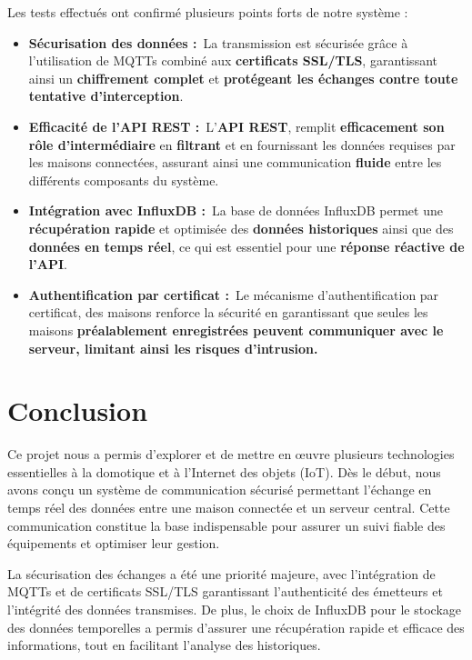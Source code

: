 \documentclass[10pt, a4paper]{report}
\begin{document}
	Les tests effectués ont confirmé plusieurs points forts de notre système : 
	\begin{itemize}
		\item  \textbf{Sécurisation des données :} La transmission est sécurisée grâce à l'utilisation de MQTTs combiné aux \textbf{certificats SSL/TLS}, garantissant ainsi un \textbf{chiffrement complet} et \textbf{protégeant les échanges contre toute tentative d'interception}.  
		\item  \textbf{Efficacité de l’API REST :} L’\textbf{API REST}, remplit \textbf{efficacement son rôle d'intermédiaire} en \textbf{filtrant} et en fournissant les données requises par les maisons connectées, assurant ainsi une communication \textbf{fluide} entre les différents composants du système.  
		\item  \textbf{Intégration avec InfluxDB :} La base de données InfluxDB permet une \textbf{récupération rapide} et optimisée des \textbf{données historiques} ainsi que des\textbf{ données en temps réel}, ce qui est essentiel pour une \textbf{réponse réactive de l'API}.  
		\item  \textbf{Authentification par certificat :} Le mécanisme d'authentification par certificat, des maisons renforce la sécurité en garantissant que seules les maisons \textbf{préalablement enregistrées peuvent communiquer avec le serveur, limitant ainsi les risques d'intrusion.}
	\end{itemize} 


	
	\chapter{Conclusion}
	Ce projet nous a permis d’explorer et de mettre en œuvre plusieurs technologies essentielles à la domotique et à l’Internet des objets (IoT). Dès le début, nous avons conçu un système de communication sécurisé permettant l’échange en temps réel des données entre une maison connectée et un serveur central. Cette communication constitue la base indispensable pour assurer un suivi fiable des équipements et optimiser leur gestion.
	
	La sécurisation des échanges a été une priorité majeure, avec l’intégration de MQTTs et de certificats SSL/TLS garantissant l’authenticité des émetteurs et l’intégrité des données transmises. De plus, le choix de InfluxDB pour le stockage des données temporelles a permis d’assurer une récupération rapide et efficace des informations, tout en facilitant l’analyse des historiques.
	
\end{document}
